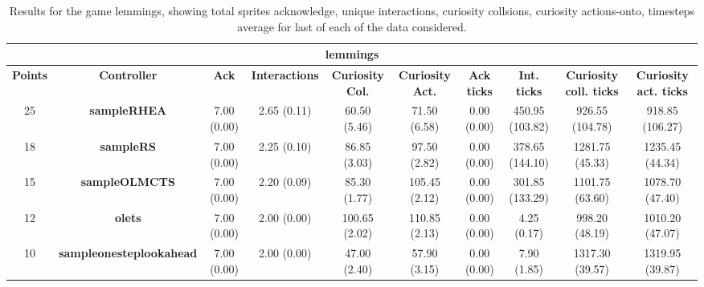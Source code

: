 \begin{table*}[!t]
\begin{center}
\begin{adjustbox}{width=1\textwidth}
\begin{tabular}{|c|c|c|c|c|c|c|c|c|c|}
\multicolumn{10}{c}{\textbf{lemmings}}\\
\hline
\textbf{Points} & \textbf{Controller} & \textbf{Ack} & \textbf{Interactions} & \textbf{Curiosity Col.} & \textbf{Curiosity Act.} & \textbf{Ack ticks} & \textbf{Int. ticks} & \textbf{Curiosity coll. ticks} & \textbf{Curiosity act. ticks}\\
\hline
25 & \textbf{sampleRHEA} & 7.00 (0.00) & 2.65 (0.11) & 60.50 (5.46) & 71.50 (6.58) & 0.00 (0.00) & 450.95 (103.82) & 926.55 (104.78) & 918.85 (106.27)
 \\
\hline
18 & \textbf{sampleRS} & 7.00 (0.00) & 2.25 (0.10) & 86.85 (3.03) & 97.50 (2.82) & 0.00 (0.00) & 378.65 (144.10) & 1281.75 (45.33) & 1235.45 (44.34)
 \\
\hline
15 & \textbf{sampleOLMCTS} & 7.00 (0.00) & 2.20 (0.09) & 85.30 (1.77) & 105.45 (2.12) & 0.00 (0.00) & 301.85 (133.29) & 1101.75 (63.60) & 1078.70 (47.40)
 \\
\hline
12 & \textbf{olets} & 7.00 (0.00) & 2.00 (0.00) & 100.65 (2.02) & 110.85 (2.13) & 0.00 (0.00) & 4.25 (0.17) & 998.20 (48.19) & 1010.20 (47.07)
 \\
\hline
10 & \textbf{sampleonesteplookahead} & 7.00 (0.00) & 2.00 (0.00) & 47.00 (2.40) & 57.90 (3.15) & 0.00 (0.00) & 7.90 (1.85) & 1317.30 (39.57) & 1319.95 (39.87)
 \\
\hline
\end{tabular}
\end{adjustbox}
\caption{Results for the game lemmings, showing total sprites acknowledge, unique interactions, curiosity collsions, curiosity actions-onto, timesteps average for last of each of the data considered.}
\label{tab:weights}
\end{center}
\end{table*}
